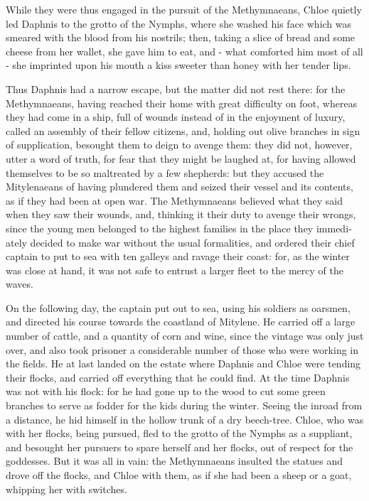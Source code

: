 \documentclass{book}
\begin{document}
\begin{pairs}
\begin{Rightside}
\begin{english}
  While they were thus engaged in the pursuit of the Methymnaeans, Chloe quietly led Daphnis to the grotto of the Nymphs, where she washed his face which was smeared with the blood from his nostrils; then, taking a slice of bread and some cheese from her wallet, she gave him to eat, and - what comforted him most of all - she imprinted upon his mouth a kiss sweeter than honey with her tender lips.
\pend


  Thus Daphnis had a narrow escape, but the matter did not rest there: for the Methymnaeans, having reached their home with great difficulty on foot, whereas they had come in a ship, full of wounds instead of in the enjoyment of luxury, called an assembly of their fellow citizens, and, holding out olive branches in sign of supplication, besought them to deign to avenge them: they did not, however, utter a word of truth, for fear that they might be laughed at, for having allowed themselves to be so maltreated by a few shepherds: but they accused the Mitylenaeans of having plundered them and seized their vessel and its contents, as if they had been at open war. The Methymnaeans believed what they said when they saw their wounds, and, thinking it their duty to avenge their wrongs, since the young men belonged to the highest families in the place they immediately decided to make war without the usual formalities, and ordered their chief captain to put to sea with ten galleys and ravage their coast: for, as the winter was close at hand, it was not safe to entrust a larger fleet to the mercy of the waves.
\pend


  On the following day, the captain put out to sea, using his soldiers as oarsmen, and directed his course towards the coastland of Mitylene.  He carried off a large number of cattle, and a quantity of corn and wine, since the vintage was only just over, and also took prisoner a considerable number of those who were working in the fields. He at last landed on the estate where Daphnis and Chloe were tending their flocks, and carried off everything that he could find.  At the time Daphnis was not with his flock: for he had gone up to the wood to cut some green branches to serve as fodder for the kids during the winter. Seeing the inroad from a distance, he hid himself in the hollow trunk of a dry beech-tree. Chloe, who was with her flocks, being pursued, fled to the grotto of the Nymphs as a suppliant, and besought her pursuers to spare herself and her flocks, out of respect for the goddesses. But it was all in vain: the Methymnaeans insulted the statues and drove off the flocks, and Chloe with them, as if she had been a sheep or a goat, whipping her with switches.
\pend



\end{english}
\end{Rightside}
\end{pairs}
\end{document}
